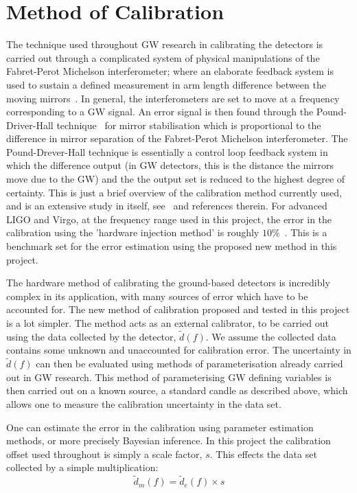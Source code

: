 \documentclass{jpconf}
\begin{document}
\section{Method of Calibration}
\label{sec:methofcal}



The technique used throughout GW research in calibrating the detectors is carried out through a complicated system of physical manipulations of the Fabret-Perot Michelson interferometer; where an elaborate feedback system is used to sustain a defined measurement in arm length difference between the moving mirrors~\cite{LIGOCal}. In general, the interferometers are set to move at a frequency corresponding to a GW signal. An error signal is then found through the Pound-Driver-Hall technique~\cite{Black} for mirror stabilisation which is proportional to the difference in mirror separation of the Fabret-Perot Michelson interferometer. The Pound-Drever-Hall technique is essentially a control loop feedback system in which the difference output (in GW detectors, this is the distance the mirrors move due to the GW) and the the output set is reduced to the highest degree of certainty. This is just a brief overview of the calibration method currently used, and is an extensive study in itself, see~\cite{Vitale} and references therein. For advanced LIGO and Virgo, at the frequency range used in this project, the error in the calibration using the 'hardware injection method' is roughly $10\%$~\cite{Vitale}. This is a benchmark set for the error estimation using the proposed new method in this project. 


The hardware method of calibrating the ground-based detectors is incredibly complex in its application, with many sources of error which have to be accounted for. The new method of calibration proposed and tested in this project is a lot simpler. The method acts as an external calibrator, to be carried out using the data collected by the detector, $\tilde{d}(f)$. We assume the collected data contains some unknown and unaccounted for calibration error. The uncertainty in $\tilde{d}(f)$ can then be evaluated using methods of parameterisation already carried out in GW research. This method of parameterising GW defining variables is then carried out on a known source, a standard candle as described above, which allows one to measure the calibration uncertainty in the data set. 

One can estimate the error in the calibration using parameter estimation methods, or more precisely Bayesian inference. In this project the calibration offset used throughout is simply a scale factor, $s$. This effects the data set collected by a simple multiplication:
\begin{equation}
  \label{eq:scaledata}
  \tilde{d}_m(f) = \tilde{d}_e(f) \times s
\end{equation}
\end{document}
